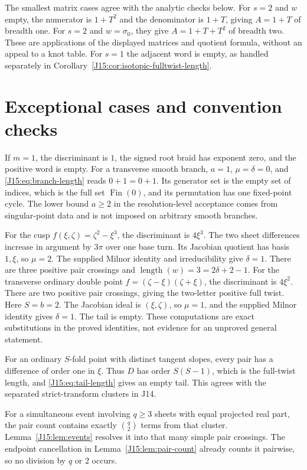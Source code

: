 \documentclass[11pt,oneside]{report}
\theoremstyle{definition}
\numberwithin{equation}{section}
\newcommand{\length}{\operatorname{length}}
\begin{document}
The smallest matrix cases agree with the analytic checks below.
For $s=2$ and $w$ empty, the numerator is $1+T^2$ and the denominator
is $1+T$, giving $A=1+T$ of breadth one. For $s=2$ and
$w=\sigma_0$, they give $A=1+T+T^2$ of breadth two. These are
applications of the displayed matrices and quotient formula, without
an appeal to a knot table. For $s=1$ the adjacent word is empty,
as handled separately in Corollary~\ref{J15:cor:isotopic-fulltwist-length}.


\section{Exceptional cases and convention checks}\label{J15:sec:exceptions}

If $m=1$, the discriminant is $1$, the signed root braid has exponent zero,
and the positive word is empty. For a transverse smooth branch, $a=1$,
$\mu=\delta=0$, and \eqref{J15:eq:branch-length} reads $0+1=0+1$.
Its generator set is the empty set of indices, which is the full set
$\operatorname{Fin}(0)$, and its permutation has one fixed-point cycle.
The lower bound $a\ge2$ in the resolution-level acceptance comes from
singular-point data and is not imposed on arbitrary smooth branches.

For the cusp $f(\xi,\zeta)=\zeta^2-\xi^3$, the discriminant is
$4\xi^3$. The two sheet differences increase in argument by $3\pi$
over one base turn. Its Jacobian quotient has basis $1,\xi$, so
$\mu=2$. The supplied Milnor identity and irreducibility give
$\delta=1$. There are three positive pair crossings and
$\length(w)=3=2\delta+2-1$.
For the transverse ordinary double point
$f=(\zeta-\xi)(\zeta+\xi)$, the discriminant is $4\xi^2$.
There are two positive pair crossings, giving the two-letter positive
full twist. Here $S=b=2$. The Jacobian ideal is $(\xi,\zeta)$, so $\mu=1$,
and the supplied Milnor identity gives $\delta=1$. The tail is empty.
These computations are exact substitutions in the proved identities,
not evidence for an unproved general statement.

For an ordinary $S$-fold point with distinct tangent slopes, every pair
has a difference of order one in $\xi$. Thus $D$ has order $S(S-1)$,
which is the full-twist length, and \eqref{J15:eq:tail-length} gives an empty
tail. This agrees with the separated strict-transform clusters in J14.

For a simultaneous event involving $q\ge3$ sheets with equal projected
real part, the pair count contains exactly $\binom q2$ terms from that
cluster. Lemma~\ref{J15:lem:events} resolves it into that many simple pair
crossings. The endpoint cancellation in Lemma~\ref{J15:lem:pair-count}
already counts it pairwise, so no division by $q$ or $2$ occurs.
\end{document}
